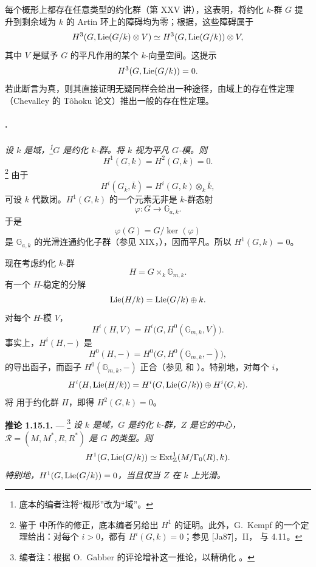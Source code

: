 每个概形上都存在任意类型的约化群（第 XXV 讲），这表明，将约化 \(k\)-群 \(G\) 提升到剩余域为 \(k\) 的 Artin 环上的障碍均为零；根据，这些障碍属于
\[
  H^3(G,\operatorname{Lie}(G/k)\otimes V)
  \simeq H^3(G,\operatorname{Lie}(G/k))\otimes V,
\]
其中 \(V\) 是赋予 \(G\) 的平凡作用的某个 \(k\)-向量空间。这提示
\[
  H^3(G,\operatorname{Lie}(G/k))=0.
\]
若此断言为真，则其直接证明无疑同样会给出一种途径，由域上的存在性定理（Chevalley 的 Tôhoku 论文）推出一般的存在性定理。

\paragraph{.}
\emph{设 \(k\) 是域，\footnote{底本的编者注将“概形”改为“域”。}\(G\) 是约化 \(k\)-群。将 \(k\) 视为平凡 \(G\)-模。则}
\[
  H^1(G,k)=H^2(G,k)=0.
\]
\footnote{鉴于  中所作的修正，底本编者另给出 \(H^1\) 的证明。此外，G.~Kempf 的一个定理给出：对每个 \(i>0\)，都有 \(H^i(G,k)=0\)；参见 [Ja87]，II， 与 4.11。}
由于
\[
  H^i(G_{\bar k},\bar k)=H^i(G,k)\otimes_k\bar k,
\]
可设 \(k\) 代数闭。\(H^1(G,k)\) 的一个元素无非是 \(k\)-群态射
\[
  \varphi:G\longrightarrow\mathbb G_{a,k}.
\]
于是
\[
  \varphi(G)=G/\ker(\varphi)
\]
是 \(\mathbb G_{a,k}\) 的光滑连通约化子群（参见 XIX，），因而平凡。所以 \(H^1(G,k)=0\)。

现在考虑约化 \(k\)-群
\[
  H=G\times_k\mathbb G_{m,k}.
\]
有一个 \(H\)-稳定的分解
\[
  \operatorname{Lie}(H/k)=\operatorname{Lie}(G/k)\oplus k.
\]
对每个 \(H\)-模 \(V\)，
\[
  H^i(H,V)=H^i\bigl(G,H^0(\mathbb G_{m,k},V)\bigr).
\]
事实上，\(H^i(H,-)\) 是
\[
  H^0(H,-)
  =H^0\bigl(G,H^0(\mathbb G_{m,k},-)\bigr),
\]
的导出函子，而函子 \(H^0(\mathbb G_{m,k},-)\) 正合（参见 和 ）。特别地，对每个 \(i\)，
\[
  H^i(H,\operatorname{Lie}(H/k))
  =
  H^i(G,\operatorname{Lie}(G/k))\oplus H^i(G,k).
\]
将  用于约化群 \(H\)，即得 \(H^2(G,k)=0\)。

\medskip\noindent\textbf{推论 1.15.1.} ---
\footnote{编者注：根据 O.~Gabber 的评论增补这一推论，以精确化 。}
{\itshape 设 \(k\) 是域，\(G\) 是约化 \(k\)-群，\(Z\) 是它的中心，\(\mathscr R=(M,M^*,R,R^*)\) 是 \(G\) 的类型。则
\[
  H^1(G,\operatorname{Lie}(G/k))
  \simeq
  \operatorname{Ext}^1_{\mathbb Z}(M/\Gamma_0(R),k).
\]
特别地，\(H^1(G,\operatorname{Lie}(G/k))=0\)，当且仅当 \(Z\) 在 \(k\) 上光滑。}

